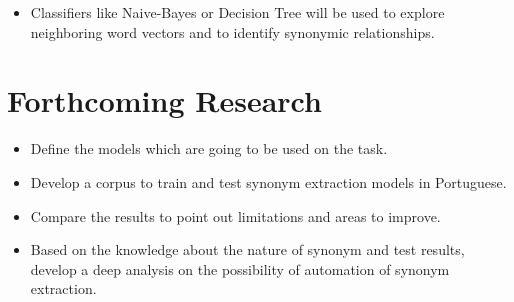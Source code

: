 \documentclass[a0,portrait]{a0poster}
\begin{document}
\begin{multicols}{2}
\begin{itemize}
	\item Classifiers like Naive-Bayes or Decision Tree will be used to explore neighboring word vectors and to identify synonymic relationships.\\
\end{itemize}


\section*{Forthcoming Research}

\begin{itemize}
	
	\item Define the models which are going to be used on the task.\\ 
	
	\item Develop a corpus to train and test synonym extraction models in Portuguese.\\
	
	\item Compare the results to point out limitations and areas to improve.\\
	
	\item Based on the knowledge about the nature of synonym and test results, develop a deep analysis on the possibility of automation of synonym extraction.\\
\end{itemize}


\nocite{*} %



\end{multicols}
\end{document}
